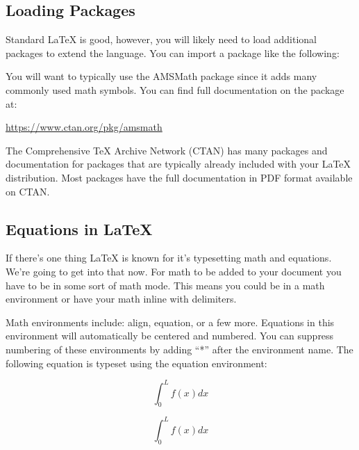 \subsection{Loading Packages}
Standard \LaTeX{} is good, however, you will likely need to load additional packages to extend the language. You can import a package like the following:

\begin{center}
\begin{latexcode}
\usepackage{amsmath}
\end{latexcode}
\end{center}
You will want to typically use the AMSMath package since it adds many commonly used math symbols. You can find full documentation on the package at:

\begin{center}
	\url{https://www.ctan.org/pkg/amsmath}
\end{center}

The Comprehensive \TeX{} Archive Network (CTAN) has many packages and documentation for packages that are typically already included with your \LaTeX{} distribution. Most packages have the full documentation in PDF format available on CTAN.


\subsection{Equations in \LaTeX{}}
If there's one thing \LaTeX{} is known for it's typesetting math and equations. We're going to get into that now. For math to be added to your document you have to be in some sort of math mode. This means you could be in a math environment or have your math inline with delimiters. 

Math environments include: align, equation, or a few more. Equations in this environment will automatically be centered and numbered. You can suppress numbering of these environments by adding ``*'' after the environment name. The following equation is typeset using the equation environment:

\begin{equation}
	\int_{0}^{L} f(x) dx
\end{equation}

\begin{center}
\begin{latexcode}
\begin{equation}
\int_{0}^{L} f(x) dx
\end{equation}
\end{latexcode}
\end{center}

